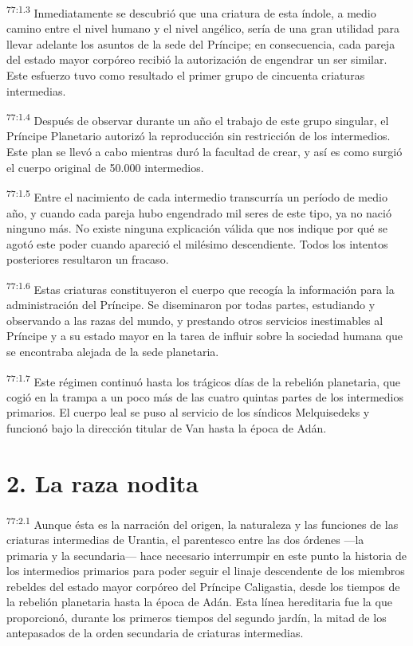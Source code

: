 \par
\textsuperscript{77:1.3} Inmediatamente se descubrió que una criatura de esta índole, a medio camino entre el nivel humano y el nivel angélico, sería de una gran utilidad para llevar adelante los asuntos de la sede del Príncipe; en consecuencia, cada pareja del estado mayor corpóreo recibió la autorización de engendrar un ser similar. Este esfuerzo tuvo como resultado el primer grupo de cincuenta criaturas intermedias.

\par
\textsuperscript{77:1.4} Después de observar durante un año el trabajo de este grupo singular, el Príncipe Planetario autorizó la reproducción sin restricción de los intermedios. Este plan se llevó a cabo mientras duró la facultad de crear, y así es como surgió el cuerpo original de 50.000 intermedios.

\par
\textsuperscript{77:1.5} Entre el nacimiento de cada intermedio transcurría un período de medio año, y cuando cada pareja hubo engendrado mil seres de este tipo, ya no nació ninguno más. No existe ninguna explicación válida que nos indique por qué se agotó este poder cuando apareció el milésimo descendiente. Todos los intentos posteriores resultaron un fracaso.

\par
\textsuperscript{77:1.6} Estas criaturas constituyeron el cuerpo que recogía la información para la administración del Príncipe. Se diseminaron por todas partes, estudiando y observando a las razas del mundo, y prestando otros servicios inestimables al Príncipe y a su estado mayor en la tarea de influir sobre la sociedad humana que se encontraba alejada de la sede planetaria.

\par
\textsuperscript{77:1.7} Este régimen continuó hasta los trágicos días de la rebelión planetaria, que cogió en la trampa a un poco más de las cuatro quintas partes de los intermedios primarios. El cuerpo leal se puso al servicio de los síndicos Melquisedeks y funcionó bajo la dirección titular de Van hasta la época de Adán.

\section*{2. La raza nodita}
\par
\textsuperscript{77:2.1} Aunque ésta es la narración del origen, la naturaleza y las funciones de las criaturas intermedias de Urantia, el parentesco entre las dos órdenes ---la primaria y la secundaria--- hace necesario interrumpir en este punto la historia de los intermedios primarios para poder seguir el linaje descendente de los miembros rebeldes del estado mayor corpóreo del Príncipe Caligastia, desde los tiempos de la rebelión planetaria hasta la época de Adán. Esta línea hereditaria fue la que proporcionó, durante los primeros tiempos del segundo jardín, la mitad de los antepasados de la orden secundaria de criaturas intermedias.

